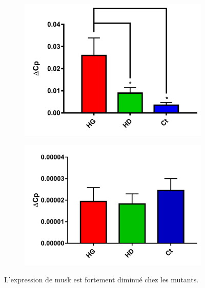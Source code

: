 \begin{figure}[h]
\begin{center}
\begin{subfigure}[h]{0.329\textwidth}
			\end{subfigure}
			\begin{subfigure}[h]{0.329\textwidth}
				\caption{}
				\label{fig:qPCRCompaWT}
				\includegraphics[width=\textwidth]{./Images/qPCR/Comp_Struct_WT.jpg}
			\end{subfigure}
			\begin{subfigure}[h]{0.329\textwidth}
				\caption{}
				\label{fig:qPCRCompaMut}
				\includegraphics[width=\textwidth]{./Images/qPCR/Comp_Struct_Mut.jpg}
			\end{subfigure}
		\end{center}
		\caption{L'expression de \gls{musk} est fortement diminué chez les mutants.}
\end{figure}
